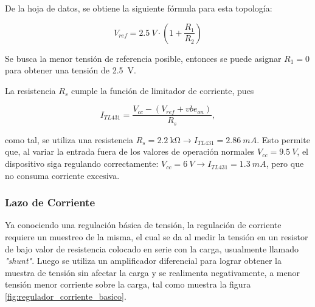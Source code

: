 \documentclass[]{article}
\begin{document}
De la hoja de datos, se obtiene la siguiente fórmula para esta topología:

\begin{equation}
V_{ref} = \SI{2.5}{V} \cdot \left( 1 + \frac{R_1}{R_2}\right)
\end{equation}

Se busca la menor tensión de referencia posible, entonces se puede asignar $R_1 = 0$ para obtener una tensión de \SI{2.5}{V}.

La resistencia $R_s$ cumple la función de limitador de corriente, pues 

\begin{equation}
I_{TL431} = \frac{V_{cc}-(V_{ref} + vbe_{on})}{R_s},
\end{equation}

como tal, se utiliza una resistencia $R_s = \SI{2,2}{\kilo\ohm} \rightarrow I_{TL431} = \SI{2.86}{mA}$. Esto permite que, al variar la entrada fuera de los valores de operación normales $V_{cc} = \SI{9.5}{V}$, el dispositivo siga regulando correctamente: $V_{cc} = \SI{6}{V} \rightarrow I_{TL431} = \SI{1.3}{mA}$, pero que no consuma corriente excesiva.
\FloatBarrier
\subsubsection{Lazo de Corriente}
\FloatBarrier
Ya conociendo una regulación básica de tensión, la regulación de corriente requiere un muestreo de la misma, el cual se da al medir la tensión en un resistor de bajo valor de resistencia colocado en serie con la carga, usualmente llamado \textit{"shunt"}. Luego se utiliza un amplificador diferencial para lograr obtener la muestra de tensión sin afectar la carga y se realimenta negativamente, a menor tensión menor corriente sobre la carga, tal como muestra la figura \ref{fig:regulador_corriente_basico}.
\end{document}
